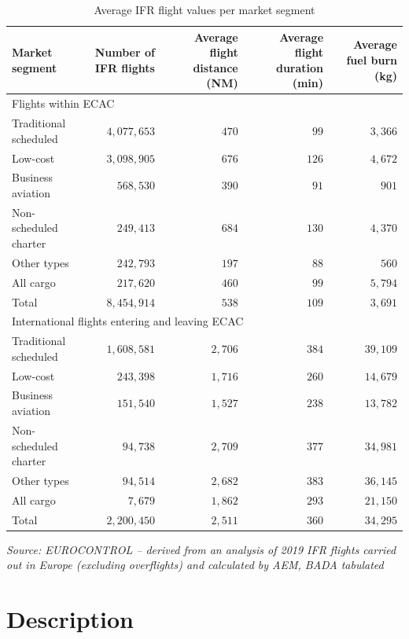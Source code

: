 \documentclass[
  11pt,
  a4paper,
]{book}
\begin{document}
\hypertarget{tbl-ifr-info}{}
\setlength{\LTpost}{0mm}
\begin{longtable}{lrrrr}
\caption{\label{tbl-ifr-info}Average IFR flight values per market segment }\tabularnewline

\toprule
Market segment & Number of IFR flights & Average flight distance (NM) & Average flight duration (min) & Average fuel burn (kg) \\ 
\midrule
\multicolumn{5}{l}{Flights within ECAC} \\ 
\midrule
Traditional scheduled & $4,077,653$ & $470$ & $99$ & $3,366$ \\ 
Low-cost & $3,098,905$ & $676$ & $126$ & $4,672$ \\ 
Business aviation & $568,530$ & $390$ & $91$ & $901$ \\ 
Non-scheduled charter & $249,413$ & $684$ & $130$ & $4,370$ \\ 
Other types & $242,793$ & $197$ & $88$ & $560$ \\ 
All cargo & $217,620$ & $460$ & $99$ & $5,794$ \\ 
Total & $8,454,914$ & $538$ & $109$ & $3,691$ \\ 
\midrule
\multicolumn{5}{l}{International flights entering and leaving ECAC} \\ 
\midrule
Traditional scheduled & $1,608,581$ & $2,706$ & $384$ & $39,109$ \\ 
Low-cost & $243,398$ & $1,716$ & $260$ & $14,679$ \\ 
Business aviation & $151,540$ & $1,527$ & $238$ & $13,782$ \\ 
Non-scheduled charter & $94,738$ & $2,709$ & $377$ & $34,981$ \\ 
Other types & $94,514$ & $2,682$ & $383$ & $36,145$ \\ 
All cargo & $7,679$ & $1,862$ & $293$ & $21,150$ \\ 
Total & $2,200,450$ & $2,511$ & $360$ & $34,295$ \\ 
\bottomrule
\end{longtable}
\begin{minipage}{\linewidth}
\emph{Source: EUROCONTROL -- derived from an analysis of 2019 IFR flights carried out in Europe (excluding overflights) and calculated by AEM, BADA tabulated}\\
\end{minipage}

\hypertarget{description-7}{%
\section{Description}\label{description-7}}
\end{document}

